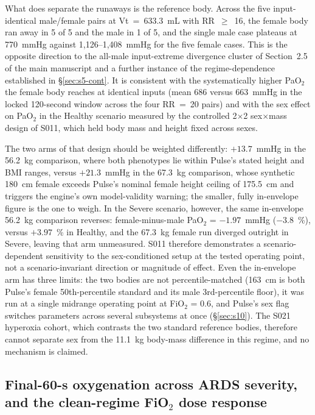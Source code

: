 \documentclass[pdflatex,sn-nature]{sn-jnl}%
\newcommand{\mainref}[2]{#2}
\begin{document}
What does separate the runaways is the reference body. Across the five input-identical male/female pairs at Vt~=~633.3~mL with RR~$\geq$~16, the female body ran away in 5 of 5 and the male in 1 of 5, and the single male case plateaus at 770~mmHg against 1{,}126--1{,}408~mmHg for the five female cases. This is the opposite direction to the all-male input-extreme divergence cluster of Section~\mainref{sec:results-sex}{2.5} of the main manuscript and a further instance of the regime-dependence established in \S\ref{sec:s5-cont}. It is consistent with the systematically higher PaO$_2$ the female body reaches at identical inputs (mean 686 versus 663~mmHg in the locked 120-second window across the four RR~=~20 pairs) and with the sex effect on PaO$_2$ in the Healthy scenario measured by the controlled 2$\times$2 sex$\times$mass design of S011, which held body mass and height fixed across sexes.

The two arms of that design should be weighted differently: $+13.7$~mmHg in the 56.2~kg comparison, where both phenotypes lie within Pulse's stated height and BMI ranges, versus $+21.3$~mmHg in the 67.3~kg comparison, whose synthetic 180~cm female exceeds Pulse's nominal female height ceiling of 175.5~cm and triggers the engine's own model-validity warning; the smaller, fully in-envelope figure is the one to weigh. In the Severe scenario, however, the same in-envelope 56.2~kg comparison reverses: female-minus-male PaO$_2$ = $-1.97$~mmHg ($-3.8$~\%), versus $+3.97$~\% in Healthy, and the 67.3~kg female run diverged outright in Severe, leaving that arm unmeasured. S011 therefore demonstrates a scenario-dependent sensitivity to the sex-conditioned setup at the tested operating point, not a scenario-invariant direction or magnitude of effect. Even the in-envelope arm has three limits: the two bodies are not percentile-matched (163~cm is both Pulse's female 50th-percentile standard and its male 3rd-percentile floor), it was run at a single midrange operating point at FiO$_2$ = 0.6, and Pulse's sex flag switches parameters across several subsystems at once (\S\ref{sec:s10}). The S021 hyperoxia cohort, which contrasts the two standard reference bodies, therefore cannot separate sex from the 11.1~kg body-mass difference in this regime, and no mechanism is claimed.

\subsection{Final-60-s oxygenation across ARDS severity, and the clean-regime FiO$_2$ dose response}\label{sec:s9-shunt}
\end{document}
